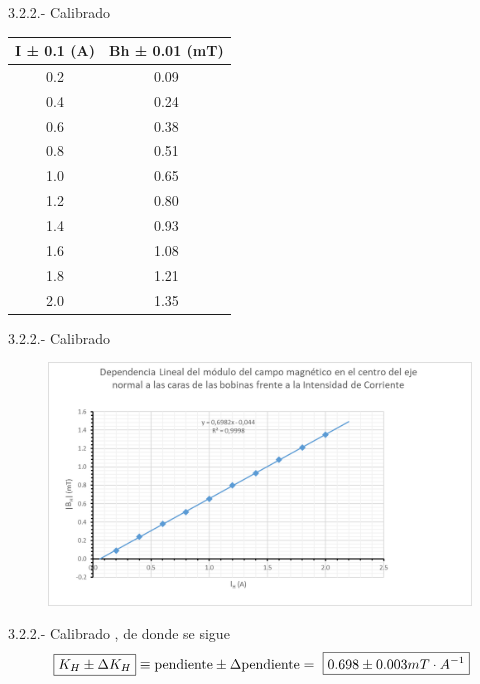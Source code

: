 \documentclass{beamer}
\makeatletter
\newcommand{\commentedbox}[2]{%
  \mbox{
    \begin{tabular}[t]{@{}c@{}}
    $\boxed{\displaystyle#1}$\\
    #2
    \end{tabular}%
  }%
}
\makeatother
\begin{document}
\begin{frame}{3.2.2.- Calibrado}
    \begin{table}[]
\begin{tabular}{|c|c|}
\hline
I ± 0.1 (A) & Bh ± 0.01 (mT) \\ \hline
0.2         & 0.09           \\ \hline
0.4         & 0.24           \\ \hline
0.6         & 0.38           \\ \hline
0.8         & 0.51           \\ \hline
1.0         & 0.65           \\ \hline
1.2         & 0.80           \\ \hline
1.4         & 0.93           \\ \hline
1.6         & 1.08           \\ \hline
1.8         & 1.21           \\ \hline
2.0         & 1.35           \\ \hline
\end{tabular}
\end{table}
\end{frame}
\begin{frame}{3.2.2.- Calibrado}
    \begin{figure}
        \centering
        \includegraphics[scale=0.6]{image2.png}
        \label{fig:my_label}
    \end{figure}
\end{frame}
\begin{frame}{3.2.2.- Calibrado}
    , de donde se sigue
    \begin{equation}
        \commentedbox{K_{H} \pm \Delta K_{H}}{} \equiv \text{pendiente} \pm \Delta \text{pendiente} = \commentedbox{0.698 \pm 0.003 mT \cdot A^{-1}}{} \nonumber
    \end{equation}
\end{frame}
\end{document}

